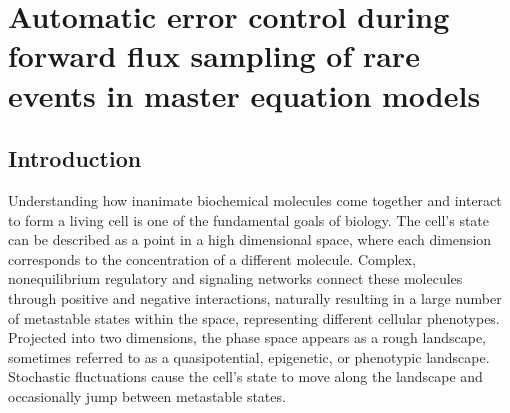 \chapter{Automatic error control during forward flux sampling of rare events in master equation models}

\section{Introduction}


Understanding how inanimate biochemical molecules come together and interact to form a living cell is one of the fundamental goals of biology\supercite{Harold:2003uu}. The cell's state can be described as a point in a high dimensional space, where each dimension corresponds to the concentration of a different molecule. Complex, nonequilibrium regulatory and signaling networks connect these molecules through positive and negative interactions, naturally resulting in a large number of metastable states within the space\supercite{Zhou:2012fc},  representing different cellular phenotypes. Projected into two dimensions, the phase space appears as a rough landscape, sometimes referred to as a quasipotential\supercite{Zhou:2012fc}, epigenetic\supercite{Waddington:1957ub}, or phenotypic\supercite{Nichols:2011cb} landscape. Stochastic fluctuations cause the cell's state to move along the landscape and occasionally jump between metastable states.



